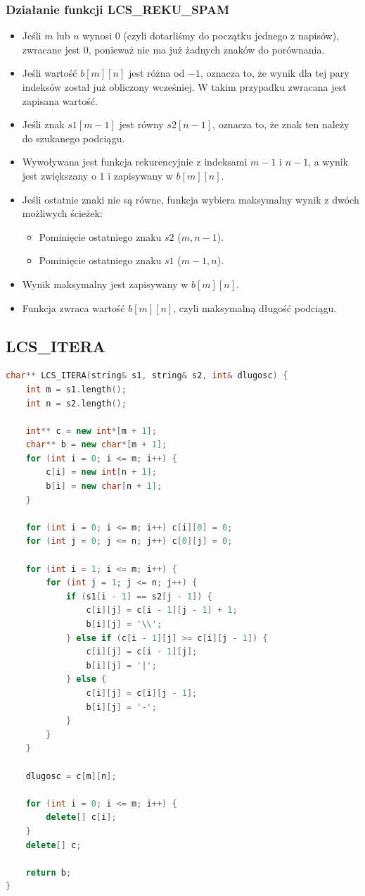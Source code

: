 \documentclass{article}
\begin{document}
		\subsubsection*{Działanie funkcji LCS\_REKU\_SPAM}
		\begin{itemize}
			\item Jeśli $m$ lub $n$ wynosi $0$ (czyli dotarliśmy do początku jednego z napisów), zwracane jest $0$, ponieważ nie ma już żadnych znaków do porównania.
			\item Jeśli wartość $b[m][n]$ jest różna od $-1$, oznacza to, że wynik dla tej pary indeksów został już obliczony wcześniej. W takim przypadku zwracana jest zapisana wartość.
			\item Jeśli znak $s1[m-1]$ jest równy $s2[n-1]$, oznacza to, że znak ten należy do szukanego podciągu.
			\item Wywoływana jest funkcja rekurencyjnie z indeksami $m-1$ i $n-1$, a wynik jest zwiększany o $1$ i zapisywany w $b[m][n]$.
			\item Jeśli ostatnie znaki nie są równe, funkcja wybiera maksymalny wynik z dwóch możliwych ścieżek:
			\begin{itemize}
				\item Pominięcie ostatniego znaku $s2$ ($m, n-1$).
				\item Pominięcie ostatniego znaku $s1$ ($m-1, n$).
			\end{itemize}
			\item Wynik maksymalny jest zapisywany w $b[m][n]$.
			\item Funkcja zwraca wartość $b[m][n]$, czyli maksymalną długość podciągu.
		\end{itemize}

	\subsection*{LCS\_ITERA} 
	\begin{lstlisting}[language=C++, tabsize=3, basicstyle=\footnotesize]
char** LCS_ITERA(string& s1, string& s2, int& dlugosc) {
	int m = s1.length();
	int n = s2.length();
	
	int** c = new int*[m + 1];
	char** b = new char*[m + 1];
	for (int i = 0; i <= m; i++) {
		c[i] = new int[n + 1];
		b[i] = new char[n + 1];
	}
	
	for (int i = 0; i <= m; i++) c[i][0] = 0;
	for (int j = 0; j <= n; j++) c[0][j] = 0;
	
	for (int i = 1; i <= m; i++) {
		for (int j = 1; j <= n; j++) {
			if (s1[i - 1] == s2[j - 1]) {
				c[i][j] = c[i - 1][j - 1] + 1;
				b[i][j] = '\\'; 
			} else if (c[i - 1][j] >= c[i][j - 1]) {
				c[i][j] = c[i - 1][j];
				b[i][j] = '|'; 
			} else {
				c[i][j] = c[i][j - 1];
				b[i][j] = '-'; 
			}
		}
	}
	
	dlugosc = c[m][n];
	
	for (int i = 0; i <= m; i++) {
		delete[] c[i];
	}
	delete[] c;
	
	return b;
}
		
	\end{lstlisting}
		
\end{document}
